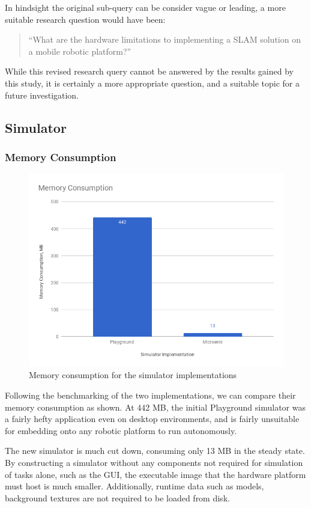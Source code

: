 In hindsight the original sub-query can be consider vague or leading, a more
suitable research question would have been:

\begin{quote}
``What are the hardware limitations to implementing a SLAM solution on a
mobile robotic platform?''
\end{quote}

While this revised research query cannot be answered by the results gained by
this study, it is certainly a more appropriate question, and a suitable topic
for a future investigation.


\subsection{Simulator}
\subsubsection{Memory Consumption}
\begin{figure}[!h]
    \centering
    \includegraphics[width=\textwidth]{memory.png}
    \caption{Memory consumption for the simulator implementations}
\end{figure}
Following the benchmarking of the two implementations, we can compare their
memory consumption as shown. At 442 MB, the initial Playground simulator was a
fairly hefty application even on desktop environments, and is fairly unsuitable
for embedding onto any robotic platform to run autonomously.

The new simulator is much cut down, consuming only 13 MB in the steady state.
By constructing a simulator without any components not required for simulation
of tasks alone, such as the GUI, the executable image that the hardware
platform must host is much smaller. Additionally, runtime data such as models,
background textures are not required to be loaded from disk.

